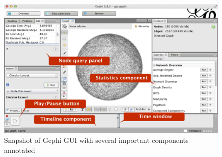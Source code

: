 \begin{figure}[h]
    \centering
    \includegraphics[width=\textwidth]{figures/gui_ann}
    \caption{Snapshot of Gephi GUI with several important components
        annotated}
\end{figure}

